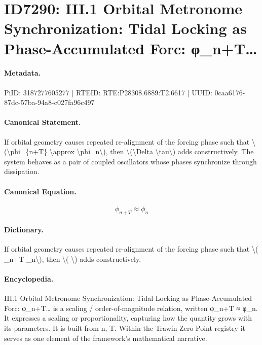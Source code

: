 \section*{ID7290: III.1 Orbital Metronome Synchronization: Tidal Locking as Phase-Accumulated Forc: φ\_n+T…}
\paragraph{Metadata.}
PiID: 3187277605277 | RTEID: RTE:P28308.6889:T2.6617 | UUID: 0caa6176-87dc-57ba-94a8-c027fa96c497

\paragraph{Canonical Statement.}
If orbital geometry causes repeated re-alignment of the forcing phase such that \textbackslash{}(\textbackslash{}phi\_\{n+T\} \textbackslash{}approx \textbackslash{}phi\_n\textbackslash{}), then \textbackslash{}(\textbackslash{}Delta \textbackslash{}tau\textbackslash{}) adds constructively. The system behaves as a pair of coupled oscillators whose phases synchronize through dissipation.

\paragraph{Canonical Equation.}
\[
\phi_{n+T} \approx \phi_n
\]

\paragraph{Dictionary.}
If orbital geometry causes repeated re-alignment of the forcing phase such that \textbackslash{}( \_n+T \_n\textbackslash{}), then \textbackslash{}( \textbackslash{}) adds constructively.

\paragraph{Encyclopedia.}
III.1 Orbital Metronome Synchronization: Tidal Locking as Phase-Accumulated Forc: φ\_n+T… is a scaling / order-of-magnitude relation, written φ\_n+T ≈ φ\_n. It expresses a scaling or proportionality, capturing how the quantity grows with its parameters. It is built from n, T. Within the Trawin Zero Point registry it serves as one element of the framework's mathematical narrative.
